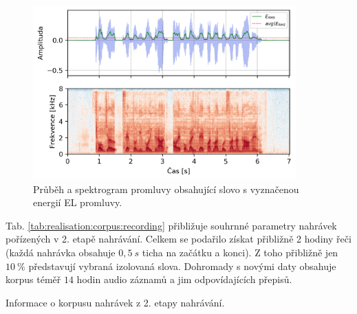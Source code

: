 \begin{figure}[hbpt]
  \centering
  \includegraphics[width=0.9\textwidth]{./ch5-construction/img/energy_spec_sentence.png}
  \caption[Průběh a spektrogram promluvy obsahující slovo .]{Průběh a spektrogram promluvy obsahující slovo  s vyznačenou energií EL promluvy.}
  \label{fig:realisation:corpus:sentence}
\end{figure}

Tab. \ref{tab:realisation:corpus:recording} přibližuje souhrnné parametry nahrávek pořízených v 2. etapě nahrávání.
Celkem se podařilo získat přibližně 2 hodiny řeči (každá nahrávka obsahuje $0,5\ s$ ticha na začátku a konci).
Z toho přibližně jen $10\ \%$ představují vybraná izolovaná slova.
Dohromady s novými daty obsahuje korpus téměř $14$ hodin audio záznamů a jim odpovídajících přepisů.

\begin{table}[htpb]
  \centering
  \def\arraystretch{1.5}
  \caption{Informace o korpusu nahrávek z 2. etapy nahrávání.}
  \label{tab:realisation:corpus:recording}
\end{table}

